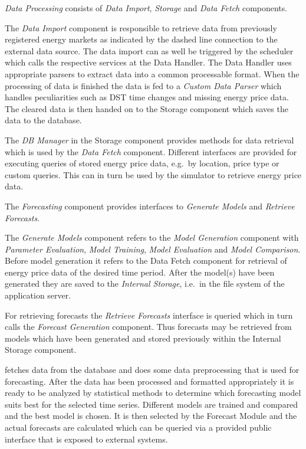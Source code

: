 \textit{Data Processing} consists of \textit{Data Import}, \textit{Storage} and \textit{Data Fetch} components. 

The \textit{Data Import} component is responsible to retrieve data from previously registered energy markets as indicated by the dashed line connection to the external data source. The data import can as well be triggered by the scheduler which calls the respective services at the Data Handler. The Data Handler uses appropriate parsers to extract data into a common processable format. When the processing of data is finished the 
data is fed to a \textit{Custom Data Parser} which handles peculiarities such as DST time changes and missing energy price data. The cleared data is then handed on to the Storage component which saves the data to the database. 

The \textit{DB Manager} in the Storage component provides methods for data retrieval which is used by the \textit{Data Fetch} component. 
Different interfaces are provided for executing queries of stored energy price data, e.g.~by location, price type or custom queries. This can in turn be used by the simulator to retrieve energy price data. 

The \textit{Forecasting} component provides interfaces to \textit{Generate Models} and \textit{Retrieve Forecasts}. 

The \textit{Generate Models} component refers to the \textit{Model Generation} component with \textit{Parameter Evaluation}, \textit{Model Training}, \textit{Model Evaluation} and \textit{Model Comparison}. Before model generation it refers to the Data Fetch component for retrieval of energy price data of the desired time period. After the model(s) have been generated they are saved to the \textit{Internal Storage}, i.e.~in the file system of the application server. 

For retrieving forecasts the \textit{Retrieve Forecasts} interface is queried which in turn calls the \textit{Forecast Generation} component. Thus forecasts may be retrieved from models which have been generated and stored previously within the Internal Storage component. 

fetches data from the database and does some data preprocessing that is used for forecasting. After the data has been processed and formatted appropriately it is ready to be analyzed by statistical methods to determine which forecasting model suits best for the selected time series. Different models are trained and compared and the best model is chosen. It is then selected by the Forecast Module and the actual forecasts are calculated which can be queried via a provided public interface that is exposed to external systems. 

